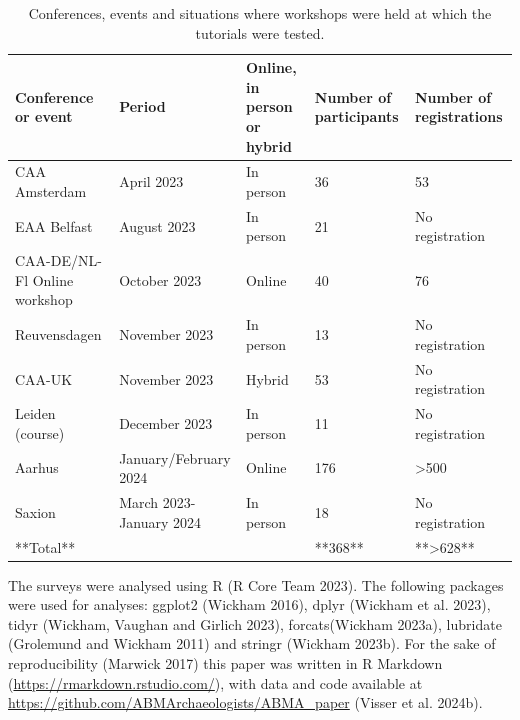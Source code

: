 \documentclass[
]{article}
\begin{document}
\begin{table}

\caption{\label{tab:events}Conferences, events and situations where workshops were held at which the tutorials were tested.}
\centering
\begin{tabular}[t]{l|l|l|l|l}
\hline
Conference or event & Period & Online, in person or hybrid & Number of participants & Number of registrations\\
\hline
CAA Amsterdam & April 2023 & In person & 36 & 53\\
\hline
EAA Belfast & August 2023 & In person & 21 & No registration\\
\hline
CAA-DE/NL-Fl Online workshop & October 2023 & Online & 40 & 76\\
\hline
Reuvensdagen & November 2023 & In person & 13 & No registration\\
\hline
CAA-UK & November 2023 & Hybrid & 53 & No registration\\
\hline
Leiden (course) & December 2023 & In person & 11 & No registration\\
\hline
Aarhus & January/February 2024 & Online & 176 & >500\\
\hline
Saxion & March 2023-January 2024 & In person & 18 & No registration\\
\hline
**Total** &  &  & **368** & **>628**\\
\hline
\end{tabular}
\end{table}

The surveys were analysed using R (R Core Team 2023). The following packages were used for analyses: ggplot2 (Wickham 2016), dplyr (Wickham et al. 2023), tidyr (Wickham, Vaughan and Girlich 2023), forcats(Wickham 2023a), lubridate (Grolemund and Wickham 2011) and stringr (Wickham 2023b). For the sake of reproducibility (Marwick 2017) this paper was written in R Markdown (\url{https://rmarkdown.rstudio.com/}), with data and code available at \url{https://github.com/ABMArchaeologists/ABMA_paper} (Visser et al. 2024b).
\end{document}
